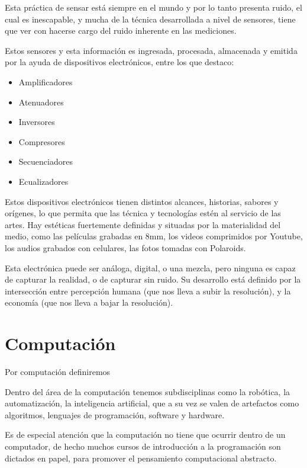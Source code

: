 \documentclass{article}
\begin{document}
Esta práctica de sensar está siempre en el mundo y por lo tanto presenta ruido, el cual es inescapable, y mucha de la técnica desarrollada a nivel de sensores, tiene que ver con hacerse cargo del ruido inherente en las mediciones.

Estos sensores y esta información es ingresada, procesada, almacenada y emitida por la ayuda de dispositivos electrónicos, entre los que destaco:

\begin{itemize}
    \item Amplificadores
    \item Atenuadores
    \item Inversores
    \item Compresores
    \item Secuenciadores
    \item Ecualizadores
\end{itemize}

Estos dispositivos electrónicos tienen distintos alcances, historias, sabores y orígenes, lo que permita que las técnica y tecnologías estén al servicio de las artes. Hay estéticas fuertemente definidas y situadas por la materialidad del medio, como las películas grabadas en 8mm, los videos comprimidos por Youtube, los audios grabados con celulares, las fotos tomadas con Polaroids.

Esta electrónica puede ser análoga, digital, o una mezcla, pero ninguna es capaz de capturar la realidad, o de capturar sin ruido. Su desarrollo está definido por la intersección entre percepción humana (que nos lleva a subir la resolución), y la economía (que nos lleva a bajar la resolución).

\clearpage

\section{Computación}

Por computación definiremos 

Dentro del área de la computación tenemos subdisciplinas como la robótica, la automatización, la  inteligencia artificial, que a su vez se valen de artefactos como algoritmos, lenguajes de programación, software y hardware.

Es de especial atención que la computación no tiene que ocurrir dentro de un computador, de hecho muchos cursos de introducción a la programación son dictados en papel, para promover el pensamiento computacional abstracto.
\end{document}
